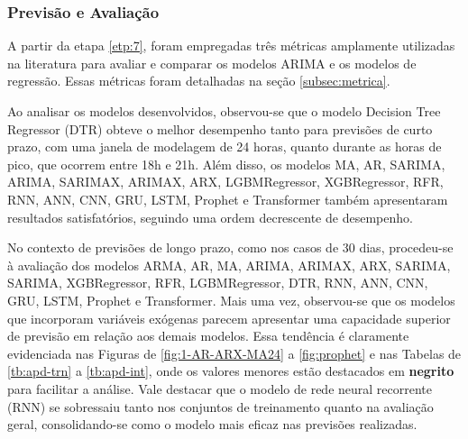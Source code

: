 \subsubsection{Previs\~ao e Avalia\c c\~ao}\label{subsubsec:modelos}

A partir da etapa \ref{etp:7}, foram empregadas três métricas amplamente utilizadas na literatura para avaliar e comparar os modelos ARIMA e os modelos de regressão. Essas métricas foram detalhadas na seção \ref{subsec:metrica}.

Ao analisar os modelos desenvolvidos, observou-se que o modelo Decision Tree Regressor (DTR) obteve o melhor desempenho tanto para previsões de curto prazo, com uma janela de modelagem de 24 horas, quanto durante as horas de pico, que ocorrem entre 18h e 21h. Além disso, os modelos MA, AR, SARIMA, ARIMA, SARIMAX, ARIMAX, ARX, LGBMRegressor, XGBRegressor, RFR, RNN, ANN, CNN, GRU, LSTM, Prophet e Transformer também apresentaram resultados satisfatórios, seguindo uma ordem decrescente de desempenho.

No contexto de previsões de longo prazo, como nos casos de 30 dias, procedeu-se à avaliação dos modelos ARMA, AR, MA, ARIMA, ARIMAX, ARX, SARIMA, SARIMA, XGBRegressor, RFR, LGBMRegressor, DTR, RNN, ANN, CNN, GRU, LSTM, Prophet e Transformer. Mais uma vez, observou-se que os modelos que incorporam variáveis exógenas parecem apresentar uma capacidade superior de previsão em relação aos demais modelos. Essa tendência é claramente evidenciada nas Figuras de \ref{fig:1-AR-ARX-MA24} a \ref{fig:prophet} e nas Tabelas de \ref{tb:apd-trn} a \ref{tb:apd-int}, onde os valores menores estão destacados em \textbf{negrito} para facilitar a análise. Vale destacar que o modelo de rede neural recorrente (RNN) se sobressaiu tanto nos conjuntos de treinamento quanto na avaliação geral, consolidando-se como o modelo mais eficaz nas previsões realizadas.
